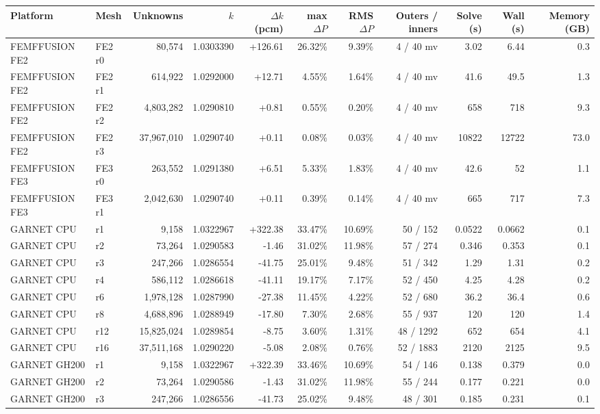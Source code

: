 \begin{tabular}{llrrrrrrrrr}
\hline
Platform & Mesh & Unknowns & $k$ & $\Delta k$ (pcm) & max $\Delta P$ & RMS $\Delta P$ & Outers / inners & Solve (s) & Wall (s) & Memory (GB) \\
\hline
FEMFFUSION FE2 & FE2 r0 & 80,574 & 1.0303390 & +126.61 & 26.32\% & 9.39\% & 4 / 40 mv & 3.02 & 6.44 & 0.3 \\
FEMFFUSION FE2 & FE2 r1 & 614,922 & 1.0292000 & +12.71 & 4.55\% & 1.64\% & 4 / 40 mv & 41.6 & 49.5 & 1.3 \\
FEMFFUSION FE2 & FE2 r2 & 4,803,282 & 1.0290810 & +0.81 & 0.55\% & 0.20\% & 4 / 40 mv & 658 & 718 & 9.3 \\
FEMFFUSION FE2 & FE2 r3 & 37,967,010 & 1.0290740 & +0.11 & 0.08\% & 0.03\% & 4 / 40 mv & 10822 & 12722 & 73.0 \\
FEMFFUSION FE3 & FE3 r0 & 263,552 & 1.0291380 & +6.51 & 5.33\% & 1.83\% & 4 / 40 mv & 42.6 & 52 & 1.1 \\
FEMFFUSION FE3 & FE3 r1 & 2,042,630 & 1.0290740 & +0.11 & 0.39\% & 0.14\% & 4 / 40 mv & 665 & 717 & 7.3 \\
GARNET CPU & r1 & 9,158 & 1.0322967 & +322.38 & 33.47\% & 10.69\% & 50 / 152 & 0.0522 & 0.0662 & 0.1 \\
GARNET CPU & r2 & 73,264 & 1.0290583 & -1.46 & 31.02\% & 11.98\% & 57 / 274 & 0.346 & 0.353 & 0.1 \\
GARNET CPU & r3 & 247,266 & 1.0286554 & -41.75 & 25.01\% & 9.48\% & 51 / 342 & 1.29 & 1.31 & 0.2 \\
GARNET CPU & r4 & 586,112 & 1.0286618 & -41.11 & 19.17\% & 7.17\% & 52 / 450 & 4.25 & 4.28 & 0.2 \\
GARNET CPU & r6 & 1,978,128 & 1.0287990 & -27.38 & 11.45\% & 4.22\% & 52 / 680 & 36.2 & 36.4 & 0.6 \\
GARNET CPU & r8 & 4,688,896 & 1.0288949 & -17.80 & 7.30\% & 2.68\% & 55 / 937 & 120 & 120 & 1.4 \\
GARNET CPU & r12 & 15,825,024 & 1.0289854 & -8.75 & 3.60\% & 1.31\% & 48 / 1292 & 652 & 654 & 4.1 \\
GARNET CPU & r16 & 37,511,168 & 1.0290220 & -5.08 & 2.08\% & 0.76\% & 52 / 1883 & 2120 & 2125 & 9.5 \\
GARNET GH200 & r1 & 9,158 & 1.0322967 & +322.39 & 33.46\% & 10.69\% & 54 / 146 & 0.138 & 0.379 & 0.0 \\
GARNET GH200 & r2 & 73,264 & 1.0290586 & -1.43 & 31.02\% & 11.98\% & 55 / 244 & 0.177 & 0.221 & 0.0 \\
GARNET GH200 & r3 & 247,266 & 1.0286556 & -41.73 & 25.02\% & 9.48\% & 48 / 301 & 0.185 & 0.231 & 0.1 \\

\end{tabular}
